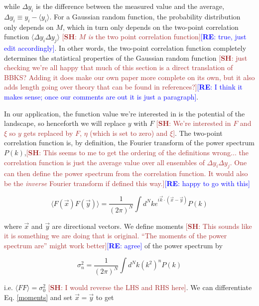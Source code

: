 \documentclass[12pt]{article}
\newcommand{\re}[1]{\textcolor{blue}{[{\bf RE}: #1]}}
\newcommand{\SH}[1]{\textcolor{brown}{[{\bf SH}: #1]}}
\begin{document}
\noindent while $\Delta y_i$ is the difference between the measured value and the average, $\Delta y_i \equiv y_i - \langle y_i \rangle$. For a Gaussian random function, the probability distribution only depends on $M$, which in turn only depends on the two-point correlation function $\langle \Delta y_i \Delta y_j \rangle$ \SH{$M$ \emph{is} the two point correlation function}\re{true, just edit accordingly}. In other words, the two-point correlation function completely determines the statistical properties of the Gaussian random function \SH{just checking we're all happy that much of this section is a direct translation of BBKS? Adding it does make our own paper more complete on its own, but it also adds length going over theory that can be found in references?}\re{I think it makes sense; once our comments are out it is just a paragraph}.

In our application, the function value we're interested in is the potential of the landscape, so henceforth we will replace $y$ with $F$ \SH{We're interested in $F$ and $\xi$ so $y$ gets replaced by $F$, $\eta$ (which is set to zero) and $\xi$}. The two-point correlation function is, by definition, the Fourier transform of the power spectrum $P(k)$,\SH{This seems to me to get the ordering of the definitions wrong... the correlation function is just the average value over all ensembles of $\Delta y_i \Delta y_j$. One can then define the power spectrum from the correlation function. It would also be the \emph{inverse} Fourier transform if defined this way.}\re{happy to go with this}

\begin{equation}
\langle F(\vec{x}) F(\vec{y}) \rangle = \frac{1}{(2\pi)^N} \int d^Nk e^{i \vec{k} \cdot (\vec{x}-\vec{y})} P(k)
\end{equation}

\noindent where $\vec{x}$ and $\vec{y}$ are directional vectors. We define moments \SH{This sounds like it is something we are doing that is original. ``The moments of the power spectrum are'' might work better}\re{agree} of the power spectrum by

\begin{equation} \label{moments}
\sigma_n^2 = \frac{1}{(2\pi)^N}\int d^Nk (k^{2})^n P(k)
\end{equation}

\noindent i.e. $\langle FF \rangle = \sigma_0^2$ \SH{I would reverse the LHS and RHS here}. We can differentiate Eq. \ref{moments} and set $\vec{x} = \vec{y}$ to get
\end{document}
